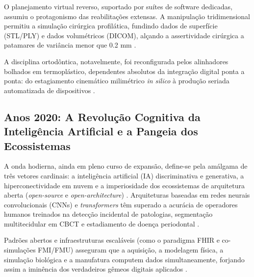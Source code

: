O planejamento virtual reverso, suportado por suítes de software dedicadas, assumiu o protagonismo das reabilitações extensas. A manipulação tridimensional permitiu a simulação cirúrgica profilática, fundindo dados de superfície (STL/PLY) e dados volumétricos (DICOM), alçando a assertividade cirúrgica a patamares de variância menor que 0.2 mm \cite{xing2024clinical}. 

A disciplina ortodôntica, notavelmente, foi reconfigurada pelos alinhadores bolhados em termoplástico, dependentes absolutos da integração digital ponta a ponta: do estagiamento cinemático milimétrico \textit{in silico} à produção seriada automatizada de dispositivos \cite{li2024aligner}.

\subsection*{Anos 2020: A Revolução Cognitiva da Inteligência Artificial e a Pangeia dos Ecossistemas}

A onda hodierna, ainda em pleno curso de expansão, define-se pela amálgama de três vetores cardinais: a inteligência artificial (IA) discriminativa e generativa, a hiperconectividade em nuvem e a imperiosidade dos ecossistemas de arquitetura aberta (\textit{open-source} e \textit{open-architecture}) \cite{infante2024fmi}. Arquiteturas baseadas em redes neurais convolucionais (CNNs) e \textit{transformers} têm superado a acurácia de operadores humanos treinados na detecção incidental de patologias, segmentação multitecidular em CBCT e estadiamento de doença periodontal \cite{elsaid2025digital}.

 Padrões abertos e infraestruturas escaláveis (como o paradigma FHIR e co-simulações FMI/FMU) asseguram que a aquisição, a modelagem física, a simulação biológica e a manufatura computem dados simultaneamente, forjando assim a iminência dos verdadeiros gêmeos digitais aplicados \cite{infante2025distributed}.
